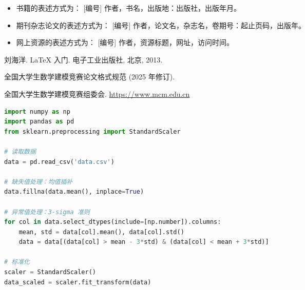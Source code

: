 \documentclass{wordreplica}
\begin{document}

\begin{itemize}
  \item 书籍的表述方式为：
    [编号] 作者，书名，出版地：出版社，出版年月。
  \item 期刊杂志论文的表述方式为：
    [编号] 作者，论文名，杂志名，卷期号：起止页码，出版年。
  \item 网上资源的表述方式为：
    [编号] 作者，资源标题，网址，访问时间。
\end{itemize}

\begin{thebibliography}{99}
    刘海洋.
    \newblock \LaTeX{} 入门\allowbreak[J].
    \newblock 电子工业出版社, 北京, 2013.

    全国大学生数学建模竞赛论文格式规范 (2025 年修订).

    全国大学生数学建模竞赛组委会.
    \newblock \url{https://www.mcm.edu.cn}
\end{thebibliography}

\clearpage



\appendix







\begin{lstlisting}[language=Python]
import numpy as np
import pandas as pd
from sklearn.preprocessing import StandardScaler

# 读取数据
data = pd.read_csv('data.csv')

# 缺失值处理：均值插补
data.fillna(data.mean(), inplace=True)

# 异常值处理：3-sigma 准则
for col in data.select_dtypes(include=[np.number]).columns:
    mean, std = data[col].mean(), data[col].std()
    data = data[(data[col] > mean - 3*std) & (data[col] < mean + 3*std)]

# 标准化
scaler = StandardScaler()
data_scaled = scaler.fit_transform(data)
\end{lstlisting}
\end{document}
